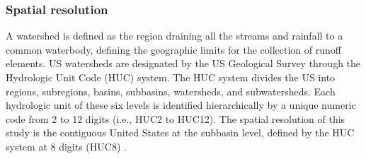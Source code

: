 \documentclass[authoryear]{elsarticle}
\begin{document}
\subsubsection{Spatial resolution}
A watershed is defined as the region draining all the streams and rainfall to a common waterbody, defining the geographic limits for the collection of runoff elements. US watersheds are designated by the US Geological Survey
through the Hydrologic Unit Code (HUC) system. The HUC system divides the US into regions, subregions, basins, subbasins, watersheds, and subwatersheds. Each hydrologic unit of these six levels is identified hierarchically by a unique numeric code from 2 to 12 digits (i.e., HUC2 to HUC12).
The spatial resolution of this study is the contiguous United States at the subbasin level, defined by the HUC system at 8 digits (HUC8) \citep{HUC8}.
\end{document}
